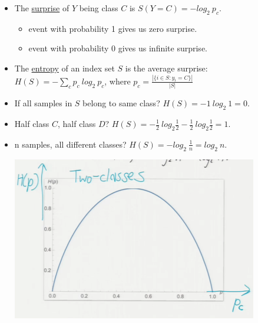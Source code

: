 \documentclass[10pt]{article}
\begin{document}
\begin{itemize}
\begin{itemize}
\begin{itemize}
					\item The \underline{surprise} of $Y$ being class $C$ is $S(Y=C) = -log_{2} \ p_{c}$.
						\begin{itemize}
							\item event with probability 1 gives us zero surprise.
							\item event with probability 0 gives us infinite surprise.
						\end{itemize}
					\item The \underline{entropy} of an index set $S$ is the average surprise: $H(S) = -\sum_{c} p_{c} \ log_{2} \ p_{c}$, where $p_{c} = \frac{|\{i \in S : y_{i} = C\}|}{|S|}$
					\item If all samples in $S$ belong to same class? $H(S) = -1 \ log_{2} \ 1 = 0$.
					\item Half class $C$, half class $D$? $H(S) = -\frac{1}{2} \ log_{2} \frac{1}{2} - \frac{1}{2} \ log_{2} \frac{1}{2} = 1$.
					\item n samples, all different classes? $H(S) = -log_{2} \ \frac{1}{n} = log_{2} \ n$.
					\begin{center}
						\includegraphics[scale=0.7]{images/entropy}
					\end{center}
				\end{itemize}
				

\end{itemize}
\end{itemize}
\end{document}
